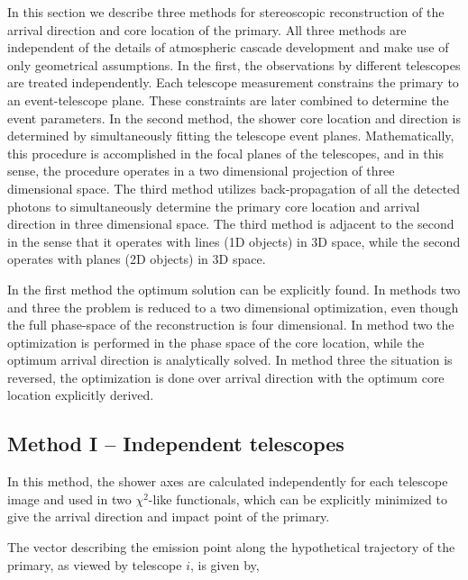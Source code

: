 \documentclass[letterpaper]{article}
\begin{document}
In this section we describe three methods for stereoscopic
reconstruction of the arrival direction and core location of the
primary. All three methods are independent of the details of atmospheric 
cascade development and make use of only geometrical assumptions. 
In the first, the observations by different telescopes are
treated independently. Each telescope measurement constrains the
primary to an event-telescope plane. These constraints are later
combined to determine the event parameters. In the second method, the
shower core location and direction is determined by simultaneously
fitting the telescope event planes. Mathematically, this procedure is
accomplished in the focal planes of the telescopes, and in this sense, the
procedure operates in a two dimensional projection of three
dimensional space. The third method utilizes back-propagation of all
the detected photons to simultaneously determine the primary core
location and arrival direction in three dimensional space. The third
method is adjacent to the second in the sense that it operates with
lines (1D objects) in 3D space, while the second operates with planes
(2D objects) in 3D space. 

In the first method the optimum solution can be explicitly found. In
methods two and three the problem is reduced to a two dimensional
optimization, even though the full phase-space of the reconstruction
is four dimensional. In method two the optimization is performed in
the phase space of the core location, while the optimum arrival
direction is analytically solved. In method three the situation is
reversed, the optimization is done over arrival direction with the
optimum core location explicitly derived.

%
%

\subsection{Method I -- Independent telescopes}

In this method, the shower axes are calculated independently for each
telescope image and used in two $\chi^2$-like functionals, which can be
explicitly minimized to give the arrival direction and impact point of
the primary.

The vector describing the emission point along the hypothetical
trajectory of the primary, as viewed by telescope $i$, is given by,
\end{document}
